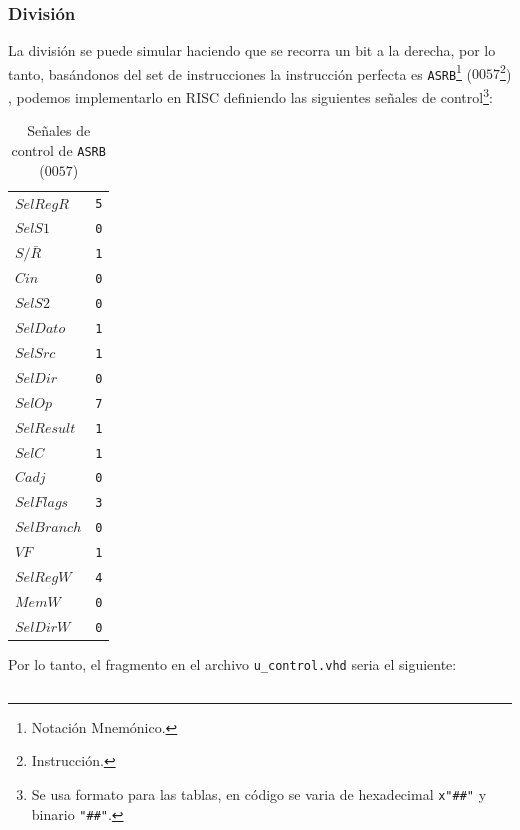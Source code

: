\documentclass{IEEEtran}
\newenvironment{code}{\captionsetup{type=listing}}{}
\begin{document}
\subsubsection{División}
\label{sec:org8d3d9e2}
La división se puede simular haciendo que se recorra un bit a la derecha, por lo tanto, basándonos del set de instrucciones la instrucción perfecta es \texttt{ASRB}\footnote{Notación Mnemónico.} (\(0057\)\footnote{Instrucción.}) \cite[p. 24]{PM1999}, podemos implementarlo en RISC definiendo las siguientes señales de control\footnote{Se usa formato para las tablas, en código se varia de hexadecimal \texttt{x"\#\#"} y binario \texttt{"\#\#"}.}:
\begin{table}[htbp]
\caption{Señales de control de \texttt{ASRB} (\(0057\))}
\centering
\begin{tabular}{ll}
\hline
\(SelRegR\) & \texttt{5}\\
\(SelS1\) & \texttt{0}\\
\(S/\bar{R}\) & \texttt{1}\\
\(Cin\) & \texttt{0}\\
\(SelS2\) & \texttt{0}\\
\(SelDato\) & \texttt{1}\\
\(SelSrc\) & \texttt{1}\\
\(SelDir\) & \texttt{0}\\
\(SelOp\) & \texttt{7}\\
\(SelResult\) & \texttt{1}\\
\(SelC\) & \texttt{1}\\
\(Cadj\) & \texttt{0}\\
\(SelFlags\) & \texttt{3}\\
\(SelBranch\) & \texttt{0}\\
\(VF\) & \texttt{1}\\
\(SelRegW\) & \texttt{4}\\
\(MemW\) & \texttt{0}\\
\(SelDirW\) & \texttt{0}\\
\hline
\end{tabular}
\end{table}
Por lo tanto, el fragmento en el archivo \texttt{u\_control.vhd} seria el siguiente:
\begin{code}
\caption{\texttt{ASRB} en \texttt{u\_control.vhd}}
\inputminted[firstline=413, lastline=431]{vhdl}{../Risc/u_control.vhd}
\end{code}
\end{document}
